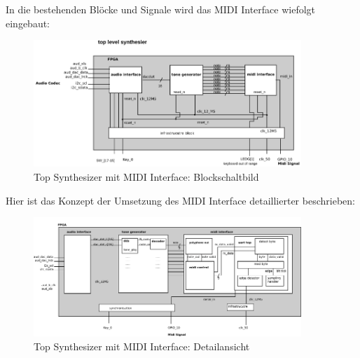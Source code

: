 In die bestehenden Blöcke und Signale wird das MIDI Interface wiefolgt eingebaut:\\
\begin{figure}[H]
	\centering
	\includegraphics[width=0.9\textwidth]{images/midi_interface/top_synthesizer_block_saled.png}
	\caption{Top Synthesizer mit MIDI Interface: Blockschaltbild}
	\label{fig.top_synthesizer_block}
\end{figure}

Hier ist das Konzept der Umsetzung des MIDI Interface detaillierter beschrieben:\\
\begin{figure}[H]
	\centering
	\includegraphics[width=0.9\textwidth]{images/midi_interface/top_synthesizer_detail_scaled.png}
	\caption{Top Synthesizer mit MIDI Interface: Detailansicht}
	\label{fig.top_synthesizer_detail}
\end{figure}



